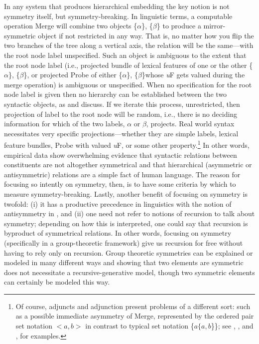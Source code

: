 \documentclass[11pt,twoside]{article}
\begin{document}
In any system that produces hierarchical embedding the key notion is not symmetry itself, but symmetry-breaking. In linguistic terms, a computable operation Merge will combine two objects \{$\alpha$\}, \{$\beta$\} to produce a mirror-symmetric object if not restricted in any way. That is, no matter how you flip the two branches of the tree along a vertical axis, the relation will be the same---with the root node label unspecified. Such an object is ambiguous to the extent that the root node label (i.e., projected bundle of lexical features of one or the other \{$\alpha$\}, \{$\beta$\}, or projected Probe of either \{$\alpha$\}, \{$\beta$\}whose \textsl{u}F gets valued during the merge operation) is ambiguous or unspecified. When no specification for the root node label is given then no hierarchy can be established between the two syntactic objects, as \cite{boeckx08bare} and \cite{chomsky95mp} discuss. If we iterate this process, unrestricted, then projection of label to the root node will be random, i.e., there is no deciding information for which of the two labels, $\alpha$ or $\beta$, projects. Real world syntax necessitates very specific projections---whether they are simple labels, lexical feature bundles, Probe with valued \textsl{u}F, or some other property.\footnote{Of course, adjuncts and adjunction present problems of a different sort: such as a possible immediate asymmetry of Merge, represented by the ordered pair set notation \mbox{$<a, b>$} in contrast to typical set notation \{$a \{a, b$\}\}; see \cite{boeckx08bare}, \cite{chametzky:2000} \cite{hn:2008}, and \cite{rubin:2002}, \cite{rubin:2003} for examples.}  In other words, empirical data show overwhelming evidence that syntactic relations between constituents are not altogether symmetrical and that hierarchical (asymmetric or antisymmetric) relations are a simple fact of human language. The reason for focusing so intently on symmetry, then, is to have some criteria by which to measure symmetry-breaking. Lastly, another benefit of focusing on symmetry is twofold: (i) it has a productive precedence in linguistics with the notion of antisymmetry in \cite{kayne:1994}, and (ii) one need not refer to notions of recursion to talk about symmetry; depending on how this is interpreted, one could say that recursion is byproduct of symmetrical relations. In other words, focusing on symmetry (specifically in a group-theoretic framework) give us recursion for free without having to rely only on recursion. Group theoretic symmetries can be explained or modeled in many different ways and showing that two elements are symmetric does not necessitate a recursive-generative model, though two symmetric elements can certainly be modeled this way. 
\end{document}
